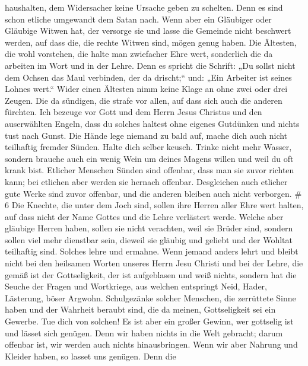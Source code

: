haushalten, dem Widersacher keine Ursache geben zu schelten.
 Denn es sind schon etliche umgewandt dem Satan nach.
 Wenn aber ein Gläubiger oder Gläubige Witwen hat, der
versorge sie und lasse die Gemeinde nicht beschwert werden, auf dass
die, die rechte Witwen sind, mögen genug haben.  Die
Ältesten, die wohl vorstehen, die halte man zwiefacher Ehre wert,
sonderlich die da arbeiten im Wort und in der Lehre.  Denn
es spricht die Schrift: „Du sollst nicht dem Ochsen das Maul verbinden,
der da drischt;`` und: „Ein Arbeiter ist seines Lohnes wert.``
 Wider einen Ältesten nimm keine Klage an ohne zwei oder
drei Zeugen.  Die da sündigen, die strafe vor allen, auf
dass sich auch die anderen fürchten.  Ich bezeuge vor Gott
und dem Herrn Jesus Christus und den auserwählten Engeln, dass du
solches haltest ohne eigenes Gutdünken und nichts tust nach Gunst.
 Die Hände lege niemand zu bald auf, mache dich auch nicht
teilhaftig fremder Sünden. Halte dich selber keusch. 
Trinke nicht mehr Wasser, sondern brauche auch ein wenig Wein um deines
Magens willen und weil du oft krank bist.  Etlicher
Menschen Sünden sind offenbar, dass man sie zuvor richten kann; bei
etlichen aber werden sie hernach offenbar.  Desgleichen
auch etlicher gute Werke sind zuvor offenbar, und die anderen bleiben
auch nicht verborgen. \# 6  Die Knechte, die unter dem Joch
sind, sollen ihre Herren aller Ehre wert halten, auf dass nicht der Name
Gottes und die Lehre verlästert werde.  Welche aber gläubige
Herren haben, sollen sie nicht verachten, weil sie Brüder sind, sondern
sollen viel mehr dienstbar sein, dieweil sie gläubig und geliebt und der
Wohltat teilhaftig sind. Solches lehre und ermahne.  Wenn
jemand anders lehrt und bleibt nicht bei den heilsamen Worten unseres
Herrn Jesu Christi und bei der Lehre, die gemäß ist der Gottseligkeit,
 der ist aufgeblasen und weiß nichts, sondern hat die Seuche
der Fragen und Wortkriege, aus welchen entspringt Neid, Hader,
Lästerung, böser Argwohn.  Schulgezänke solcher Menschen,
die zerrüttete Sinne haben und der Wahrheit beraubt sind, die da meinen,
Gottseligkeit sei ein Gewerbe. Tue dich von solchen!  Es ist
aber ein großer Gewinn, wer gottselig ist und lässet sich genügen.
 Denn wir haben nichts in die Welt gebracht; darum offenbar
ist, wir werden auch nichts hinausbringen.  Wenn wir aber
Nahrung und Kleider haben, so lasset uns genügen.  Denn die
